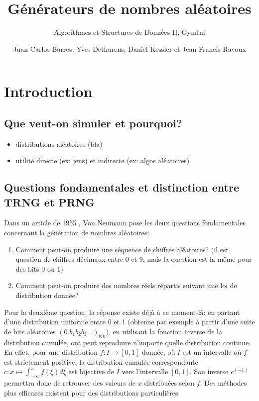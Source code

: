 \documentclass{scrartcl}
\title{Générateurs de nombres aléatoires}
\subtitle{Algorithmes et Structures de Données II, GymInf}
\author{Juan-Carlos Barros, Yves Dethurens, Daniel Kessler et Jean-Francis Ravoux}
\begin{document}
\maketitle

\tableofcontents

\section{Introduction}
\subsection{Que veut-on simuler et pourquoi?}
\begin{itemize}
\item distributions aléatoires (bla)
\item utilité directe (ex: jeus) et indirecte (ex: algos aléatoires)
\end{itemize}

\subsection{Questions fondamentales et distinction entre TRNG et PRNG}
Dans un article de 1955 \cite{VonNeumann}, Von Neumann pose les deux questions
fondamentales concernant la génération de nombres aléatoires:
\begin{enumerate}
\item Comment peut-on produire une séquence de chiffres aléatoires? (il est
  question de chiffres décimaux entre 0 et 9, mais la question est la même pour
  des bits 0 ou 1)
\item Comment peut-on produire des nombres réels répartis suivant une loi de
  distribution donnée?
\end{enumerate}
Pour la deuxième question, la réponse existe déjà à ce moment-là: en partant
d'une distribution uniforme entre 0 et 1 (obtenue par exemple à partir d'une
suite de bits aléatoires $(0.b_1b_2b_3\ldots)_{bin}$), en utilisant la fonction
inverse de la distribution cumulée, ont peut reproduire n'importe quelle
distribution continue. En effet, pour une distribution $f:I\rightarrow[0,1]$
donnée, où $I$ est un intervalle où $f$ est strictement positive, la
distribution cumulée correspondante $c:x\mapsto\int_{-\infty}^xf(\xi)d\xi$ est
bijective de $I$ vers l'intervalle $[0,1]$. Son inverse $c^{(-1)}$ permettra
donc de retrouver des valeurs de $x$ distribuées selon $f$. Des méthodes plus
efficaces existent pour des distributions particulières.\par\medskip
\end{document}

